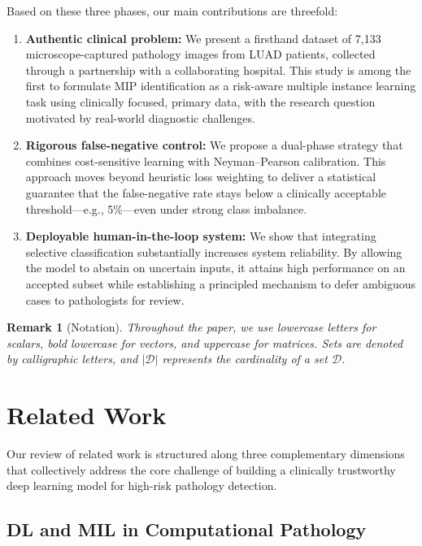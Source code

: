 \documentclass[journal,twoside,web]{ieeecolor}
\newtheorem{remark}[theorem]{Remark}
\begin{document}
Based on these three phases, our main contributions are threefold:
\begin{enumerate}
\item \textbf{Authentic clinical problem:} We present a firsthand dataset of 7,133 microscope-captured pathology images from LUAD patients, collected through a partnership with a collaborating hospital. This study is among the first to formulate MIP identification as a risk-aware multiple instance learning task using clinically focused, primary data, with the research question motivated by real-world diagnostic challenges.
\item \textbf{Rigorous false-negative control:} We propose a dual-phase strategy that combines cost-sensitive learning with Neyman–Pearson calibration. This approach moves beyond heuristic loss weighting to deliver a statistical guarantee that the false-negative rate stays below a clinically acceptable threshold—e.g., 5\%—even under strong class imbalance.
\item \textbf{Deployable human-in-the-loop system:} We show that integrating selective classification substantially increases system reliability. By allowing the model to abstain on uncertain inputs, it attains high performance on an accepted subset while establishing a principled mechanism to defer ambiguous cases to pathologists for review.
\end{enumerate}
\begin{remark}[Notation]
Throughout the paper, we use lowercase letters for scalars, bold lowercase for vectors, and uppercase for matrices. Sets are denoted by calligraphic letters, and $|\mathcal{D}|$ represents the cardinality of a set $\mathcal{D}$.
\end{remark}

\section{Related Work}\label{S6-3}

Our review of related work is structured along three complementary dimensions that collectively address the core challenge of building a clinically trustworthy deep learning model for high-risk pathology detection.

\subsection{DL and MIL in Computational Pathology}
\end{document}
